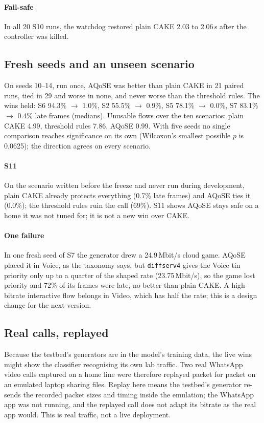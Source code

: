 \documentclass[11pt,a4paper]{article}
\begin{document}
\paragraph{Fail-safe} In all 20 S10 runs, the watchdog restored plain CAKE 2.03 to 2.06\,s after the controller was killed.

\subsection{Fresh seeds and an unseen scenario}
On seeds 10--14, run once, AQoSE was better than plain CAKE in 21 paired runs, tied in 29 and worse in none, and never worse than the threshold rules. The wins held: S6 94.3\% $\to$ 1.0\%, S2 55.5\% $\to$ 0.9\%, S5 78.1\% $\to$ 0.0\%, S7 83.1\% $\to$ 0.4\% late frames (medians). Unusable flows over the ten scenarios: plain CAKE 4.99, threshold rules 7.86, AQoSE 0.99. With five seeds no single comparison reaches significance on its own (Wilcoxon's smallest possible $p$ is 0.0625); the direction agrees on every scenario.

\paragraph{S11} On the scenario written before the freeze and never run during development, plain CAKE already protects everything (0.7\% late frames) and AQoSE ties it (0.0\%); the threshold rules ruin the call (69\%). S11 shows AQoSE stays safe on a home it was not tuned for; it is not a new win over CAKE.

\paragraph{One failure} In one fresh seed of S7 the generator drew a 24.9\,Mbit/s cloud game. AQoSE placed it in Voice, as the taxonomy says, but \texttt{diffserv4} gives the Voice tin priority only up to a quarter of the shaped rate (23.75\,Mbit/s), so the game lost priority and 72\% of its frames were late, no better than plain CAKE. A high-bitrate interactive flow belongs in Video, which has half the rate; this is a design change for the next version.

\subsection{Real calls, replayed}\label{sec:realcall}
Because the testbed's generators are in the model's training data, the live wins might show the classifier recognising its own lab traffic. Two real WhatsApp video calls captured on a home line were therefore replayed packet for packet on an emulated laptop sharing files. Replay here means the testbed's generator re-sends the recorded packet sizes and timing inside the emulation; the WhatsApp app was not running, and the replayed call does not adapt its bitrate as the real app would. This is real traffic, not a live deployment.
\end{document}
